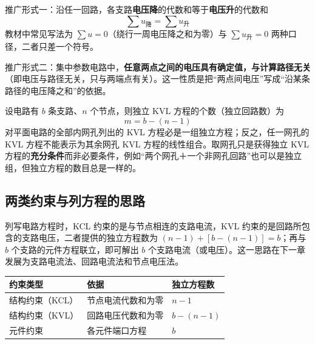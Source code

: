 推广形式一：沿任一回路，各支路\textbf{电压降}的代数和等于\textbf{电压升}的代数和
\begin{equation}
\sum u_{\text{降}}=\sum u_{\text{升}}
\end{equation}
教材中常见写法为 $\sum u=0$（绕行一周电压降之和为零）与 $\sum u_{\text{升}}=0$ 两种口径，二者只差一个符号。

推广形式二：集中参数电路中，\textbf{任意两点之间的电压具有确定值，与计算路径无关}（即电压与路径无关，只与两端点有关）。这一性质是把“两点间电压”写成“沿某条路径的电压降之和”的依据。

设电路有 $b$ 条支路、$n$ 个节点，则独立 KVL 方程的个数（独立回路数）为
\begin{equation}
m=b-(n-1)
\end{equation}
对平面电路的全部内网孔列出的 KVL 方程必是一组独立方程；反之，任一网孔的 KVL 方程不能表示为其余网孔 KVL 方程的线性组合。取网孔只是获得独立 KVL 方程的\textbf{充分条件}而非必要条件，例如“两个网孔＋一个非网孔回路”也可以是独立组，但独立方程的数目总是一样的。


\subsection{两类约束与列方程的思路}
列写电路方程时，KCL 约束的是与节点相连的支路电流，KVL 约束的是回路所包含的支路电压，二者提供的独立方程数为 $(n-1)+[b-(n-1)]=b$；再与 $b$ 个支路的元件方程联立，即可解出 $b$ 个支路电流（或电压）。这一思路在下一章发展为支路电流法、回路电流法和节点电压法。

\begin{center}
\begin{tabular}{@{}lll@{}}
\toprule
约束类型 & 依据 & 独立方程数 \\
\midrule
结构约束（KCL） & 节点电流代数和为零 & $n-1$ \\
结构约束（KVL） & 回路电压代数和为零 & $b-(n-1)$ \\
元件约束 & 各元件端口方程 & $b$ \\
\bottomrule
\end{tabular}
\end{center}

\endinput
